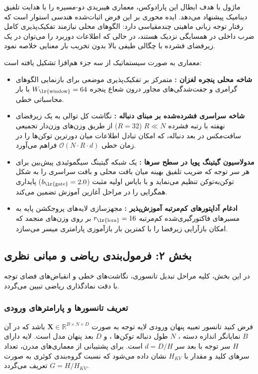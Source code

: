 ماژول  با هدف ابطال این پارادوکس، معماری هیبریدی دو-مسیره  را با هدایت تلفیق دینامیک پیشنهاد می‌دهد. ایده محوری  بر این فرض اثبات‌شده هندسی استوار است که رفتار توجه زبانی ماهیتی چندمقیاسی  دارد: الگوهای محلی نیازمند تفکیک‌پذیری کامل ضرب داخلی در همسایگی نزدیک هستند، در حالی که اطلاعات دوربرد را می‌توان در یک زیرفضای فشرده با چگالی طیفی بالا بدون تخریب بار معنایی خلاصه نمود. 

معماری  به صورت سیستماتیک از سه جزء هم‌افزا تشکیل یافته است:
\begin{itemize}
    \item \textbf{شاخه محلی پنجره لغزان :} متمرکز بر تفکیک‌پذیری موضعی برای بازنمایی الگوهای گرامری و جفت‌شدگی‌های مجاور درون شعاع پنجره $W_{\text{\lr{window}}} = 64$ با بار محاسباتی خطی.
    \item \textbf{شاخه سراسری فشرده‌شده بر مبنای دنباله :} نگاشت کل توالی به یک زیرفضای نهفته با رتبه فشرده $R \ll N$ ($R = 32$) از طریق وزن‌های وزن‌دار تجمیعی سافت‌مکس در بعد دنباله، که امکان تبادل اطلاعات میان دورترین توکن‌ها را در زمان خطی $\mathcal{O}(N \cdot R \cdot d)$ فراهم می‌آورد.
    \item \textbf{مدولاسیون گیتینگ پویا در سطح سرها :} یک شبکه گیتینگ سیگموئیدی پیش‌بین برای هر سر توجه که ضریب تلفیق بهینه میان بافت محلی و بافت سراسری را به شکل توکن‌به‌توکن تنظیم می‌نماید و با بایاس اولیه مثبت ($b_{\text{\lr{gate}}} = 2.0$) پایداری همگرایی را در مراحل آغازین آموزش تضمین می‌کند.
    \item \textbf{ادغام آداپتورهای کم‌مرتبه آموزش‌پذیر :} مجهزسازی لایه‌های پروجکشن پایه به مسیرهای فاکتورگیری‌شده کم‌مرتبه $r_{\text{\lr{lora}}} = 16$ بر روی وزن‌های منجمد  که امکان بازآرایی زیرفضا را با کمترین بار بازآموزی پارامتری میسر می‌سازد.
\end{itemize}

\subsection*{بخش ۲: فرمول‌بندی ریاضی و مبانی نظری }
در این بخش، کلیه مراحل تبدیل تانسوری، نگاشت‌های خطی و انقباض‌های فضای توجه با دقت نمادگذاری ریاضی تبیین می‌گردد.

\subsubsection*{تعریف تانسورها و پارامترهای ورودی}
فرض کنید تانسور تعبیه پنهان ورودی لایه توجه به صورت $\mathbf{X} \in \mathbb{R}^{B \times N \times D}$ باشد که در آن $B$ نمایانگر اندازه دسته ، $N$ طول دنباله توکن‌ها ، و $D$ بعد پنهان مدل  است. لایه دارای $H$ سر توجه با بعد سر $d = D / H$ است. برای پشتیبانی از معماری‌های مدرن، تعداد سرهای کلید و مقدار با $H_{KV}$ نشان داده می‌شود که نسبت گروه‌بندی کوئری  به صورت $G = H / H_{KV}$ تعریف می‌گردد.

